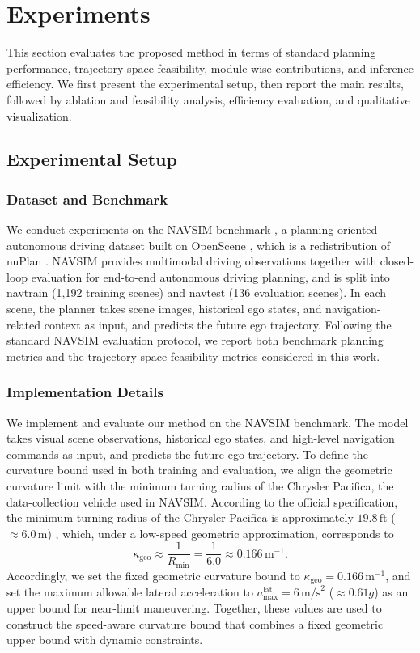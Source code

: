 \documentclass[3p,times,authoryear]{elsarticle}
\begin{document}
\section{Experiments}

This section evaluates the proposed method in terms of standard planning performance, trajectory-space feasibility, module-wise contributions, and inference efficiency. We first present the experimental setup, then report the main results, followed by ablation and feasibility analysis, efficiency evaluation, and qualitative visualization.

\subsection{Experimental Setup}

\subsubsection{Dataset and Benchmark}
We conduct experiments on the NAVSIM benchmark \citep{dauner2024navsim}, a planning-oriented autonomous driving dataset built on OpenScene \citep{openscene2024}, which is a redistribution of nuPlan \citep{karnchanachari2024nuplan}. NAVSIM provides multimodal driving observations together with closed-loop evaluation for end-to-end autonomous driving planning, and is split into navtrain (1,192 training scenes) and navtest (136 evaluation scenes). In each scene, the planner takes scene images, historical ego states, and navigation-related context as input, and predicts the future ego trajectory. Following the standard NAVSIM evaluation protocol, we report both benchmark planning metrics and the trajectory-space feasibility metrics considered in this work.

\subsubsection{Implementation Details}
We implement and evaluate our method on the NAVSIM benchmark. The model takes visual scene observations, historical ego states, and high-level navigation commands as input, and predicts the future ego trajectory. To define the curvature bound used in both training and evaluation, we align the geometric curvature limit with the minimum turning radius of the Chrysler Pacifica, the data-collection vehicle used in NAVSIM. According to the official specification, the minimum turning radius of the Chrysler Pacifica is approximately \(19.8\,\mathrm{ft}\) (\(\approx 6.0\,\mathrm{m}\)) \citep{chrysler2026pacifica_specs}, which, under a low-speed geometric approximation, corresponds to
\begin{equation}
\kappa_{\mathrm{geo}} \approx \frac{1}{R_{\min}} = \frac{1}{6.0} \approx 0.166 \,\mathrm{m}^{-1}.
\end{equation}
Accordingly, we set the fixed geometric curvature bound to \(\kappa_{\mathrm{geo}}=0.166\,\mathrm{m}^{-1}\), and set the maximum allowable lateral acceleration to \(a_{\max}^{\mathrm{lat}}=6\,\mathrm{m/s}^2\) (\(\approx 0.61g\)) as an upper bound for near-limit maneuvering. Together, these values are used to construct the speed-aware curvature bound that combines a fixed geometric upper bound with dynamic constraints.
\end{document}
